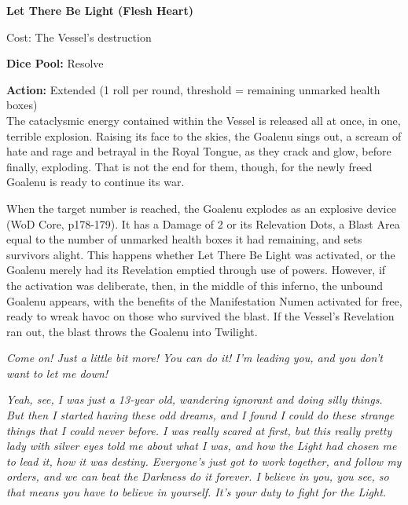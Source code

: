 \noindent\textbf{Let There Be Light (Flesh Heart)}

\noindent Cost: The Vessel's destruction

\noindent\textbf{Dice Pool:} Resolve

\noindent\textbf{Action:} Extended (1 roll per round, threshold = remaining unmarked health boxes)\\

\noindent The cataclysmic energy contained within the Vessel is released all at once, in one, terrible explosion. Raising its face to the skies, the Goalenu sings out, a scream of hate and rage and betrayal in the Royal Tongue, as they crack and glow, before finally, exploding. That is not the end for them, though, for the newly freed Goalenu is ready to continue its war.

When the target number is reached, the Goalenu explodes as an explosive device (WoD Core, p178-179). It has a Damage of 2 or its Relevation Dots, a Blast Area equal to the number of unmarked health boxes it had remaining, and sets survivors alight. This happens whether Let There Be Light was activated, or the Goalenu merely had its Revelation emptied through use of powers. However, if the activation was deliberate, then, in the middle of this inferno, the unbound Goalenu appears, with the benefits of the Manifestation Numen activated for free, ready to wreak havoc on those who survived the blast. If the Vessel's Revelation ran out, the blast throws the Goalenu into Twilight.






\newpage{}

\noindent\textit{Come on! Just a little bit more! You can do it! I'm leading you, and you don't want to let me down! }

\textit{Yeah, see, I was just a 13-year old, wandering ignorant and doing silly things. But then I started having these odd dreams, and I found I could do these strange things that I could never before. I was really scared at first, but this really pretty lady with silver eyes told me about what I was, and how the Light had chosen me to lead it, how it was destiny. Everyone's just got to work together, and follow my orders, and we can beat the Darkness do it forever. I believe in you, you see, so that means you have to believe in yourself. It's your duty to fight for the Light.}

